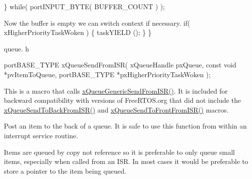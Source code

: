 \begin{DoxyPre}    \} while( portINPUT\_BYTE( BUFFER\_COUNT ) );\end{DoxyPre}



\begin{DoxyPre}Now the buffer is empty we can switch context if necessary.
    if( xHigherPriorityTaskWoken )
    \{
        taskYIELD ();
    \}
 \}
 \end{DoxyPre}


queue. h 
\begin{DoxyPre}
 portBASE\_TYPE xQueueSendFromISR(
                                     xQueueHandle pxQueue,
                                     const void *pvItemToQueue,
                                     portBASE\_TYPE *pxHigherPriorityTaskWoken
                                );
 \end{DoxyPre}


This is a macro that calls \hyperlink{queue_8c_a6cf5fbaaec7bad15c9dfba98972e6888}{x\-Queue\-Generic\-Send\-From\-I\-S\-R()}. It is included for backward compatibility with versions of Free\-R\-T\-O\-S.\-org that did not include the \hyperlink{queue_8h_a5a4b46fc55ab9f63b89878b37352f521}{x\-Queue\-Send\-To\-Back\-From\-I\-S\-R()} and \hyperlink{queue_8h_a849dd669e72bfb12314f4445157c9a04}{x\-Queue\-Send\-To\-Front\-From\-I\-S\-R()} macros.

Post an item to the back of a queue. It is safe to use this function from within an interrupt service routine.

Items are queued by copy not reference so it is preferable to only queue small items, especially when called from an I\-S\-R. In most cases it would be preferable to store a pointer to the item being queued.


